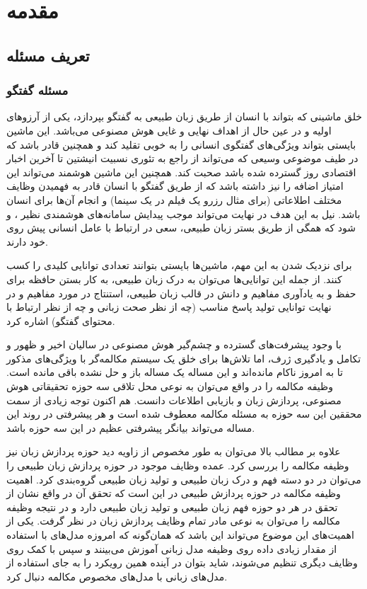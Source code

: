 \chapter{مقدمه}\label{Chap:Chap1}
\minitoc

\section{تعریف مسئله} \label{chap1:prob_define}

\subsection{‌مسئله گفتگو}
خلق ماشینی که بتواند با انسان از طریق زبان طبیعی به گفتگو بپردازد، یکی از آرزو‌های اولیه و در عین حال از اهداف نهایی و غایی هوش مصنوعی می‌باشد.
این ماشین بایستی بتواند ویژگی‌های گفتگوی انسانی را به خوبی تقلید کند و همچنین قادر باشد که در طیف موضوعی وسیعی که می‌تواند از راجع به تئوری نسبیت انیشتین تا آخرین اخبار اقتصادی روز گسترده ‌شده باشد صحبت کند.
همچنین این ماشین هوشمند می‌تواند این امتیاز اضافه را نیز داشته باشد که از طریق گفتگو با انسان قادر به فهمیدن وظایف مختلف اطلاعاتی (برای مثال رزرو یک فیلم در یک سینما) و انجام آن‌ها برای انسان باشد.
نیل به این هدف در نهایت می‌تواند موجب پیدایش سامانه‌های هوشمندی نظیر
، 
 و 
  شود که همگی از طریق 
بستر زبان طبیعی، سعی در ارتباط با عامل انسانی پیش‌ روی خود دارند.

برای نزدیک شدن به این مهم، ماشین‌ها بایستی بتوانند تعدادی توانایی کلیدی را کسب کنند. از جمله این توانایی‌ها می‌توان به درک زبان طبیعی، به کار بستن حافظه برای حفظ و به یادآوری مفاهیم و دانش در قالب زبان طبیعی،‌ استنتاج در مورد مفاهیم و در نهایت توانایی تولید پاسخ مناسب (چه از نظر صحت زبانی و چه از نظر ارتباط با محتوای گفتگو) اشاره کرد.

با وجود پیشرفت‌های گسترده و چشم‌گیر هوش مصنوعی در سالیان اخیر و ظهور و تکامل  و یادگیری ژرف، اما تلاش‌ها برای خلق یک سیستم مکالمه‌گر با ویژگی‌های مذکور تا به امروز ناکام مانده‌اند و این مساله یک مساله باز و حل نشده باقی مانده است.
وظیفه مکالمه را در واقع می‌توان به نوعی محل تلاقی سه حوزه تحقیقاتی
هوش مصنوعی، پردازش زبان و بازیابی اطلاعات دانست.
هم اکنون توجه زیادی از سمت محققین این سه حوزه به مسئله مکالمه معطوف شده است و هر پیشرفتی در روند این مساله می‌تواند بیانگر پیشرفتی عظیم در این سه حوزه باشد.

علاوه بر مطالب بالا می‌توان به طور مخصوص از زاویه دید حوزه پردازش زبان نیز وظیفه مکالمه را بررسی کرد. عمده وظایف موجود در حوزه پردازش زبان طبیعی را می‌توان در دو دسته فهم و درک زبان طبیعی و تولید زبان طبیعی گروه‌بندی کرد. اهمیت وظیفه مکالمه در حوزه پردازش طبیعی در این است که تحقق آن در واقع نشان از تحقق در هر دو حوزه فهم زبان طبیعی و تولید زبان طبیعی دارد و در نتیجه وظیفه مکالمه را می‌توان به نوعی مادر تمام وظایف پردازش زبان در نظر گرفت. یکی از اهمیت‌های این موضوع می‌تواند این باشد که همان‌گونه که امروزه مدل‌های 
 با استفاده از مقدار زیادی داده روی وظیفه مدل زبانی آموزش می‌بینند و سپس با کمک 
  روی وظایف دیگری تنظیم می‌شوند، شاید بتوان در آینده همین رویکرد را به جای استفاده از مدل‌های زبانی با مدل‌های مخصوص مکالمه دنبال کرد.




